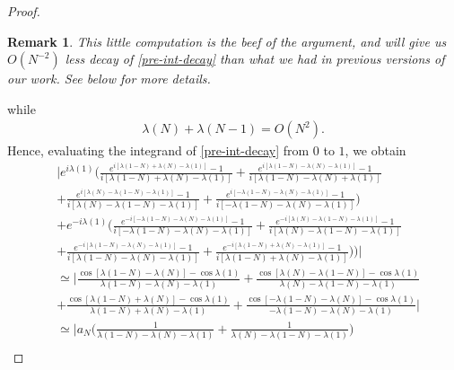 \documentclass{amsart}
\newtheorem{remark}[theorem]{Remark}
\begin{document}
\begin{proof}
\begin{framed}
\begin{remark}
  This little computation is the beef of the argument, and will give us $O(N^{-2})$ less decay of \eqref{pre-int-decay} than what we had in previous versions of our work. See below for more details. 
\end{remark}
\end{framed}
%
while
%
%
\begin{equation*}
\begin{split}
  \lambda(N) + \lambda(N-1) = O(N^{2}).
\end{split}
\end{equation*}
%
%
Hence, evaluating the integrand of \eqref{pre-int-decay} from $0$ to $1$, we obtain 
%
%
\begin{equation}
  \label{puy}
\begin{split}
  & \Big | e^{i \lambda(1)}\bigg ( \frac{e^{i[\lambda(1-N) + \lambda(N) - \lambda(1)]} - 1}{i[\lambda(1-N) + \lambda(N) - \lambda(1)]} + 
  \frac{e^{i[\lambda(1-N) - \lambda(N) - \lambda(1)]} - 1}{i[\lambda(1-N) - \lambda(N) + \lambda(1)]}  
  \\
  & +  \frac{e^{i[\lambda(N) - \lambda(1-N) - \lambda(1)]} - 1}{i[\lambda(N) - \lambda(1-N) - \lambda(1)]} + \frac{e^{i[-\lambda(1-N) - \lambda(N) - \lambda(1)]} - 1}{i[-\lambda(1-N) - \lambda(N) - \lambda(1)]} \bigg ) 
  \\
  & + e^{-i \lambda(1)}\bigg ( \frac{e^{-i[-\lambda(1-N) - \lambda(N) - \lambda(1)]} - 1}{i[-\lambda(1-N) - \lambda(N) - \lambda(1)]} + 
  \frac{e^{-i[\lambda(N) - \lambda(1-N) - \lambda(1)]} - 1}{i[\lambda(N) - \lambda(1-N) - \lambda(1)]} 
  \\
  & +  \frac{e^{-i[\lambda(1-N) - \lambda(N) - \lambda(1)]} - 1}{i[\lambda(1-N) - \lambda(N) - \lambda(1)]} + \frac{e^{-i[\lambda(1-N) + \lambda(N) - \lambda(1)]} - 1}{i[\lambda(1-N) + \lambda(N) - \lambda(1)]} \bigg ) 
  \bigg )  \bigg |
  \\
  & \simeq \bigg | \frac{\cos[\lambda(1-N) - \lambda(N)] - \cos \lambda(1)}{\lambda(1-N) - \lambda(N) - \lambda(1)} + \frac{\cos[\lambda(N) - \lambda(1-N)] - \cos \lambda(1)}{\lambda(N) - \lambda(1-N) - \lambda(1)} 
  \\
  & + \frac{\cos[\lambda(1-N) + \lambda(N)] - \cos \lambda(1)}{\lambda(1-N) + \lambda(N) - \lambda(1)} + \frac{\cos[-\lambda(1-N) - \lambda(N)] - \cos \lambda(1)}{-\lambda(1-N) - \lambda(N) - \lambda(1)}
  \bigg | 
  \\
  & \simeq \bigg | a_{N} \bigg ( \frac{1}{\lambda(1-N) - \lambda(N) - \lambda(1)} + \frac{1}{\lambda(N) - \lambda(1-N) - \lambda(1)} \bigg )
  \\

\end{split}
\end{equation}
\end{proof}
\end{document}
